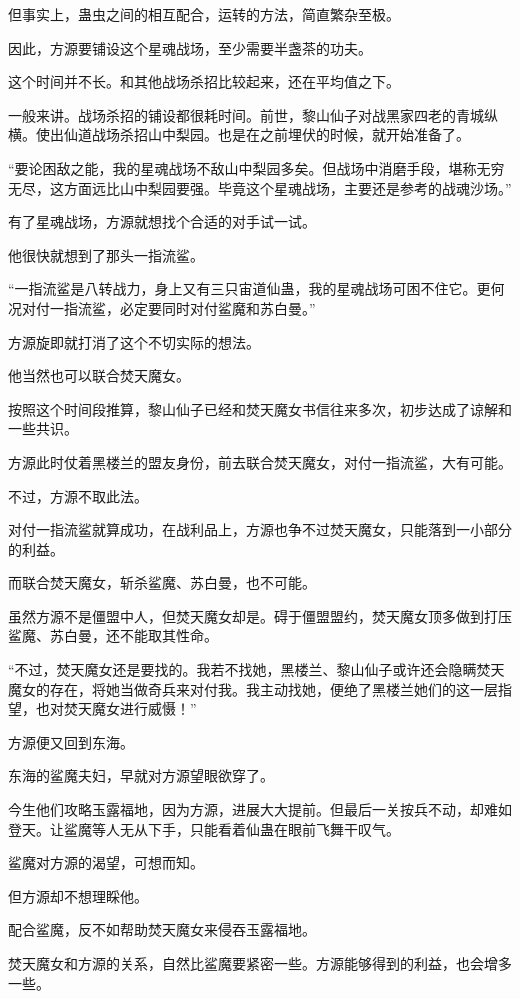 \begin{this_body}
但事实上，蛊虫之间的相互配合，运转的方法，简直繁杂至极。

因此，方源要铺设这个星魂战场，至少需要半盏茶的功夫。

这个时间并不长。和其他战场杀招比较起来，还在平均值之下。

一般来讲。战场杀招的铺设都很耗时间。前世，黎山仙子对战黑家四老的青城纵横。使出仙道战场杀招山中梨园。也是在之前埋伏的时候，就开始准备了。

“要论困敌之能，我的星魂战场不敌山中梨园多矣。但战场中消磨手段，堪称无穷无尽，这方面远比山中梨园要强。毕竟这个星魂战场，主要还是参考的战魂沙场。”

有了星魂战场，方源就想找个合适的对手试一试。

他很快就想到了那头一指流鲨。

“一指流鲨是八转战力，身上又有三只宙道仙蛊，我的星魂战场可困不住它。更何况对付一指流鲨，必定要同时对付鲨魔和苏白曼。”

方源旋即就打消了这个不切实际的想法。

他当然也可以联合焚天魔女。

按照这个时间段推算，黎山仙子已经和焚天魔女书信往来多次，初步达成了谅解和一些共识。

方源此时仗着黑楼兰的盟友身份，前去联合焚天魔女，对付一指流鲨，大有可能。

不过，方源不取此法。

对付一指流鲨就算成功，在战利品上，方源也争不过焚天魔女，只能落到一小部分的利益。

而联合焚天魔女，斩杀鲨魔、苏白曼，也不可能。

虽然方源不是僵盟中人，但焚天魔女却是。碍于僵盟盟约，焚天魔女顶多做到打压鲨魔、苏白曼，还不能取其性命。

“不过，焚天魔女还是要找的。我若不找她，黑楼兰、黎山仙子或许还会隐瞒焚天魔女的存在，将她当做奇兵来对付我。我主动找她，便绝了黑楼兰她们的这一层指望，也对焚天魔女进行威慑！”

方源便又回到东海。

东海的鲨魔夫妇，早就对方源望眼欲穿了。

今生他们攻略玉露福地，因为方源，进展大大提前。但最后一关按兵不动，却难如登天。让鲨魔等人无从下手，只能看着仙蛊在眼前飞舞干叹气。

鲨魔对方源的渴望，可想而知。

但方源却不想理睬他。

配合鲨魔，反不如帮助焚天魔女来侵吞玉露福地。

焚天魔女和方源的关系，自然比鲨魔要紧密一些。方源能够得到的利益，也会增多一些。

\end{this_body}

